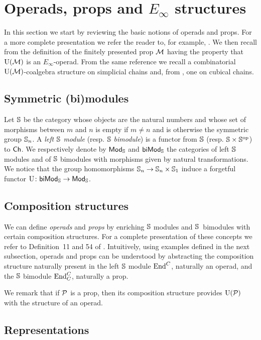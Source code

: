 
\section{Operads, props and $E_\infty$ structures} \label{s:operads and props}

In this section we start by reviewing the basic notions of operads and props.
For a more complete presentation we refer the reader to, for example, \cite{markl2008props}.
We then recall from \cite{medina2020prop1} the definition of the finitely presented prop $\M$ having the property that $\UM$ is an $E_\infty$-operad.
From the same reference we recall a combinatorial $\UM$-coalgebra structure on simplicial chains and, from \cite{medina2021cubical}, one on cubical chains. 

\subsection{Symmetric (bi)modules}

Let $\S$ be the category whose objects are the natural numbers and whose set of morphisms between $m$ and $n$ is empty if $m \neq n$ and is otherwise the symmetric group $\S_n$.
A \textit{left $\S$ module} (resp. $\S$ \textit{bimodule}) is a functor from $\S$ (resp. $\S \times \S^\op$) to $\Ch$.
We respectively denote by $\smod$ and $\sbimod$ the categories of left $\S$ modules and of $\S$ bimodules with morphisms given by natural transformations.
We notice that the group homomorphisms $\S_n \to \S_n \times \S_1$ induce a forgetful functor $\U \colon \sbimod \to \smod$.

\subsection{Composition structures}

We can define \textit{operads} and \textit{props} by enriching $\S$ modules and \mbox{$\S$ bimodules} with certain composition structures.
For a complete presentation of these concepts we refer to Definition~11 and 54 of \cite{markl2008props}.
Intuitively, using examples defined in the next subsection, operads and props can be understood by abstracting the composition structure naturally present in the left $\S$ module $\End^C$, naturally an operad, and the $\S$ bimodule $\End^C_C$, naturally a prop.

We remark that if $\P$ is a prop, then its composition structure provides $\U(\P)$ with the structure of an operad.

\subsection{Representations}

